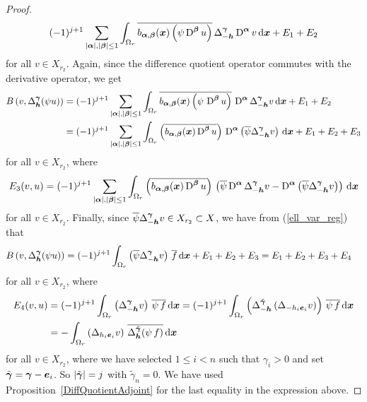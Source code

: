 \begin{proof}
\[(-1)^{j+1} \sum_{|{\bm{\alpha}}|,|{\bm{\beta}}|\leq 1}
\int_{\Omega_r} \overline{ b_{{\bm{\alpha}},{\bm{\beta}}}({\bm{x}})
\left(\psi \operatorname{D}^{{\bm{\beta}}} u\right)} \,
\Delta_{-{\bm{h}}}^{{\bm{\gamma}}} \operatorname{D}^{{\bm{\alpha}}} v \,\mathrm{d}{{\bm{x}}} + E_1 + E_2
\]
for all $v \in X_{r_2}$.
Again, since the difference quotient operator commutes with the
derivative operator, we get  
\begin{align*}
B\left(v,\Delta_{{\bm{h}}}^{{\bm{\gamma}}}(\psi u)\right)
&= (-1)^{j+1} \sum_{|{\bm{\alpha}}|,|{\bm{\beta}}|\leq 1}
\int_{\Omega_r}  \overline{ b_{{\bm{\alpha}},{\bm{\beta}}}({\bm{x}})
\left(\psi\, \operatorname{D}^{{\bm{\beta}}} u\right)}
\, \operatorname{D}^{{\bm{\alpha}}} \Delta_{-{\bm{h}}}^{{\bm{\gamma}}} v\,\mathrm{d}{{\bm{x}}}
+ E_1 + E_2 \\
&= (-1)^{j+1} \sum_{|{\bm{\alpha}}|,|{\bm{\beta}}|\leq 1}
\int_{\Omega_r} \left(\overline{b_{{\bm{\alpha}},{\bm{\beta}}}({\bm{x}})
\operatorname{D}^{{\bm{\beta}}} u} \right) \, \operatorname{D}^{{\bm{\alpha}}} \left( \overline{\psi}
\Delta_{-{\bm{h}}}^{{\bm{\gamma}}} v\right) \,\mathrm{d}{{\bm{x}}} + E_1 + E_2 + E_3
\end{align*}
for all $v \in X_{r_2}$, where
\[
E_3(v,u) = (-1)^{j+1} \sum_{|{\bm{\alpha}}|,|{\bm{\beta}}|\leq 1}
\int_{\Omega_r} \left(\overline{b_{{\bm{\alpha}},{\bm{\beta}}}({\bm{x}})
\operatorname{D}^{{\bm{\beta}}} u}\right) \,
\left(\overline{\psi} \operatorname{D}^{{\bm{\alpha}}} \Delta_{-{\bm{h}}}^{{\bm{\gamma}}} v -
\operatorname{D}^{{\bm{\alpha}}} \left( \overline{\psi}
\Delta_{-{\bm{h}}}^{{\bm{\gamma}}} v\right)\right) \,\mathrm{d}{{\bm{x}}}
\]
for all $v \in X_{r_2}$.  Finally, since
$\displaystyle \overline{\psi} \Delta_{-{\bm{h}}}^{{\bm{\gamma}}} v
\in X_{r_2} \subset X$, we have from (\ref{ell_var_reg}) that
\begin{align*}
B\left(v,\Delta_{{\bm{h}}}^{{\bm{\gamma}}}(\psi u)\right)
&= (-1)^{j+1} \int_{\Omega_r}
\left( \overline{\psi} \Delta_{-{\bm{h}}}^{{\bm{\gamma}}} v\right)\,\overline{f}
\,\mathrm{d}{{\bm{x}}} +E_1 + E_2 + E_3 = E_1 + E_2 + E_3 + E_4
\end{align*}
for all $v \in X_{r_2}$, where
\begin{align*}
E_4(v,u) &= (-1)^{j+1} \int_{\Omega_r}
\left( \Delta_{-{\bm{h}}}^{{\bm{\gamma}}} v \right)\,\overline{\psi\, f}
\,\mathrm{d}{{\bm{x}}}
= (-1)^{j+1} \int_{\Omega_r}
\left( \Delta^{\tilde{{\bm{\gamma}}}}_{-{\bm{h}}}
\left(\Delta_{-h_i {\bm{e}}_i} v \right)
\right) \,\overline{\psi\, f} \,\mathrm{d}{{\bm{x}}} \\
&= - \int_{\Omega_r} \left(\Delta_{h_i {\bm{e}}_i} v \right)
\,\overline{\Delta^{\tilde{{\bm{\gamma}}}}_{{\bm{h}}} (\psi\, f)} \,\mathrm{d}{{\bm{x}}}
\end{align*}
for all $v \in X_{r_2}$, where we have selected $1 \leq i < n$ such
that $\gamma_i >0$ and set $\tilde{{\bm{\gamma}}} = {\bm{\gamma}} - {\bm{e}}_i$.
So $|\tilde{{\bm{\gamma}}}| = j$ with $\tilde{\gamma}_n = 0$.
We have used Proposition~\ref{DiffQuotientAdjoint} for the last
equality in the expression above.


\end{proof}
